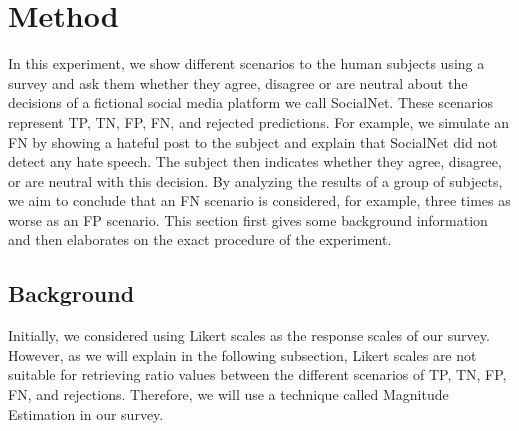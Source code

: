 \documentclass[a4paper]{article}
\begin{document}
\section{Method}
\label{sec:method}
In this experiment, we show different scenarios to the human subjects using a survey and ask them whether they agree, disagree or are neutral about the decisions of a fictional social media platform we call SocialNet. These scenarios represent TP, TN, FP, FN, and rejected predictions. For example, we simulate an FN by showing a hateful post to the subject and explain that SocialNet did not detect any hate speech. The subject then indicates whether they agree, disagree, or are neutral with this decision. By analyzing the results of a group of subjects, we aim to conclude that an FN scenario is considered, for example, three times as worse as an FP scenario. This section first gives some background information and then elaborates on the exact procedure of the experiment.

\subsection{Background}
Initially, we considered using Likert scales as the response scales of our survey. However, as we will explain in the following subsection, Likert scales are not suitable for retrieving ratio values between the different scenarios of TP, TN, FP, FN, and rejections. Therefore, we will use a technique called Magnitude Estimation in our survey.
\end{document}
